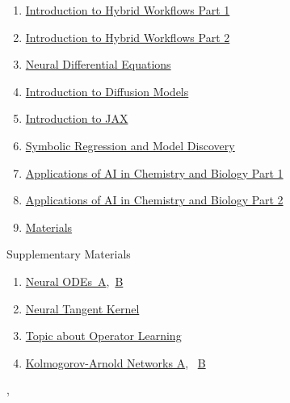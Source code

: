 \documentclass[11pt]{article}
\renewcommand{\today}{\shortmonthname[\the\month] \the \day,  \the\year}
\begin{document}
\begin{enumerate}
	\item  \href{https://mp.weixin.qq.com/s/jzBGgd9XeqOVTx5I8j34QQ}{Introduction to Hybrid Workflows Part 1}%
	\item  \href{https://mp.weixin.qq.com/s/VxdD9EywtsPI632EvBlsEw}{Introduction to Hybrid Workflows Part 2}%
	\item  \href{https://mp.weixin.qq.com/s/aCbgnQ-1bqhl9v2Adt-UQw}{Neural Differential Equations}%
	\item  \href{https://mp.weixin.qq.com/s/39QWfQbx9lCO9uCvfyE86g}{Introduction to Diffusion Models}%
	\item  \href{https://mp.weixin.qq.com/s/sdj-TSYYHWfTL6HvoneTzQ}{ Introduction to JAX}%
	\item  \href{https://mp.weixin.qq.com/s/WuNYxKklDRxUC8uTcfdcqQ}{Symbolic Regression and Model Discovery}%
	\item  \href{https://mp.weixin.qq.com/s/6NSmRsGTt4_mG1ISQ96JQg}{Applications of AI in Chemistry and Biology Part 1}%
	\item  \href{https://mp.weixin.qq.com/s/qUnkdShAVOhd-44Dc0GIQA}{Applications of AI in Chemistry and Biology Part 2}%
	\item \href{https://pan.baidu.com/s/1DXsQ69ZKXWUnzmh0ZUBKmw}{Materials}
\end{enumerate}


\begin{center}
	Supplementary Materials
\end{center}

\begin{enumerate}
	\item  \href{https://mp.weixin.qq.com/s/ohloykJvnypR8mv20LJ6ZQ}{Neural ODEs\ A},\ \href{https://mp.weixin.qq.com/s/nmwFGJy3p5XqOkcjCjlzwQ}{B}
	\item \href{https://mp.weixin.qq.com/s/m6IGDKBsGjLkFWlvm07M0A}{Neural Tangent Kernel}
	\item \href{https://mp.weixin.qq.com/s/bGy74KINQF4EBsYYx7zRvQ}{Topic about Operator Learning}
	\item \href{https://mp.weixin.qq.com/s/5XVJNM1ak2m2HzJ4Gb5Rww}{Kolmogorov-Arnold Networks A}, \ \href{https://mp.weixin.qq.com/s/kxV94EwZp_HtJuRJJU_DeA}{B}
\end{enumerate}


%
\begin{flushright}
	\tiny \today 
\end{flushright}
\end{document}
